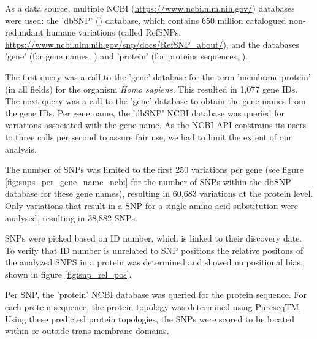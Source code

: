 As a data source, multiple
NCBI (\url{https://www.ncbi.nlm.nih.gov/}) databases were used: the 'dbSNP' (\cite{sherry2001dbsnp}) database,
which contains 650 million 
catalogued non-redundant humane variations (called RefSNPs,
\url{https://www.ncbi.nlm.nih.gov/snp/docs/RefSNP_about/}), and the databases 'gene' (for gene names, \cite{brown2015gene})
and 'protein' (for proteins sequences, \cite{sayers2010database}).


The first query was a call to the 'gene' database for the 
term 'membrane protein' (in all fields) for the organism \emph{Homo sapiens}.
This resulted in 1,077 gene IDs.
The next query was a call to the 'gene' database 
to obtain the gene names from the gene IDs.
Per gene name, the 'dbSNP' NCBI database was queried for 
variations associated with the gene name. 
As the NCBI API constrains its users to three calls per second
to assure fair use, we had to limit the extent of our analysis.

The number of SNPs
was limited to the first 250 variations per gene (see figure
\ref{fig:snps_per_gene_name_ncbi} for the number of SNPs
within the dbSNP database for these gene names),
resulting in 60,683 variations at the protein level.
Only variations that result in a SNP for
a single amino acid substitution were analysed, resulting in 38,882 SNPs.

%
SNPs were picked based on ID number, which is linked to their discovery date. To verify that ID number is unrelated to SNP positions the relative positons of the analyzed SNPS in a protein was determined and showed no positional bias, shown in figure \ref{fig:snp_rel_pos}.

Per SNP, the 'protein' NCBI database was queried for the
protein sequence.
For each protein sequence, the protein topology was determined 
using PureseqTM.
Using these predicted protein topologies, the SNPs were scored to be located within or outside trans membrane domains.


